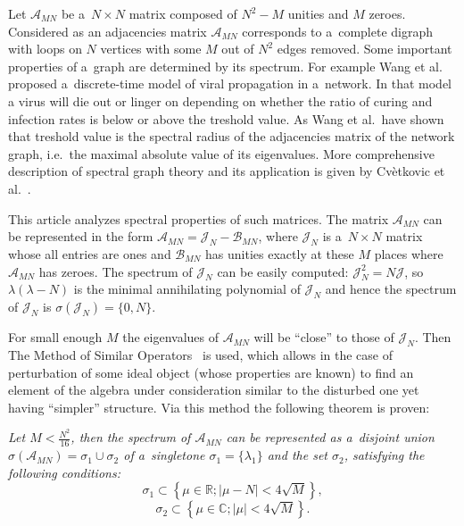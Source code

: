 Let \( \mathscr{A}_{MN} \) be a~\( N\times N \) matrix composed of
\( N^2 - M \) unities and \( M \) zeroes.
Considered as an adjacencies matrix \( \mathscr{A}_{MN} \)
corresponds to a~complete digraph with loops on \( N \) vertices
with some \( M \) out of \( N^2 \) edges removed.
Some important properties of a~graph are determined by its spectrum.
For example Wang et al.~\cite{epidemic} proposed a~discrete-time model
of viral propagation in a~network.
In that model a virus will die out or linger on
depending on whether the ratio of curing and infection rates
is below or above the treshold value.
As Wang et al.\ have shown that treshold value
is the spectral radius of the adjacencies matrix of the network graph,
i.e.\ the maximal absolute value of its eigenvalues.
More comprehensive description of spectral graph theory
and its application is given by Cv\`etkovic et al.~\cite{cvet}.

This article analyzes spectral properties of such matrices.
The matrix \( \mathscr{A}_{MN} \) can be represented in the form
\( \mathscr{A}_{MN} = \mathcal{J}_N - \mathscr{B}_{MN} \),
where \( \mathcal{J}_N \) is a~\( N\times N \) matrix
whose all entries are ones
and \( \mathcal{B}_{MN} \) has unities exactly at these \( M \)
places where \( \mathscr{A}_{MN} \) has zeroes.
The spectrum of \( \mathcal{J}_N \) can be easily computed:
\( \mathcal{J}_N^2 = N \mathcal{J} \),
so \( \lambda(\lambda - N) \) is the minimal
annihilating polynomial of \( \mathcal{J}_N \)
and hence the spectrum of \( \mathcal{J}_{N} \) is
\( \sigma(\mathcal{J}_N) = \{ 0,N \} \).

For small enough \( M \) the eigenvalues of \( \mathscr{A}_{MN} \)
will be ``close'' to those of \( \mathcal{J}_N \).
Then The Method of Similar Operators~\cite{baskakov-harmonic,baskakov-split} is used,
which allows in the case of perturbation of some ideal object (whose properties are known)
to find an element of the algebra under consideration similar to the disturbed one
yet having ``simpler'' structure.
Via this method the following theorem is proven:
\begin{center}
\it
    Let \( M < \frac{N^2}{16} \),
    then the spectrum of \( \mathscr{A}_{MN} \) can be represented as a~disjoint union
    \( \sigma\left(\mathscr{A}_{MN}\right) = \sigma_1 \cup \sigma_2 \)
    of a~singletone \( \sigma_1=\{\lambda_1\} \)
    and the set \( \sigma_2 \), satisfying the following conditions:
    \[ \sigma_1 \subset \left\{ \mu\in\mathbb{R}; \lvert \mu - N \rvert < 4\sqrt{M} \right\}, \]
    \[ \sigma_2 \subset \left\{ \mu\in\mathbb{C}; \lvert \mu \rvert < 4\sqrt{M} \right\}. \]
\end{center}
